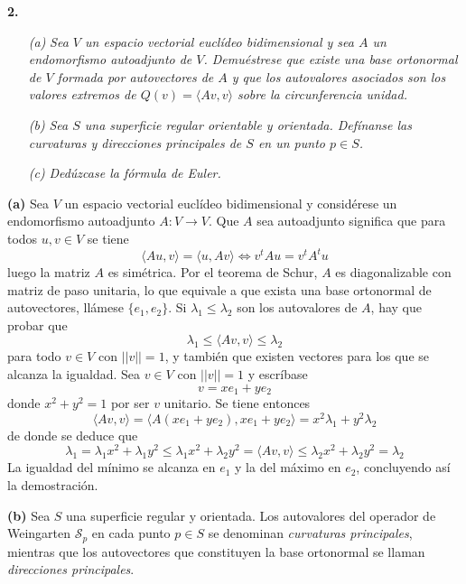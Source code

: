 \documentclass[12pt]{report}
\begin{document}
\vspace{4mm}
\textbf{2.}
\begin{itemize}
    \item[\textit{(a)}] \textit{Sea $V$ un espacio vectorial euclídeo bidimensional y sea $A$ un endomorfismo autoadjunto de $V$. Demuéstrese que existe una base ortonormal de $V$ formada por autovectores de $A$ y que los autovalores asociados son los valores extremos de $Q(v) = \langle Av,v \rangle$ sobre la circunferencia unidad.}
    \item[\textit{(b)}] \textit{Sea $S$ una superficie regular orientable y orientada. Defínanse las curvaturas y direcciones principales de $S$ en un punto $p \in S$.}
    \item[\textit{(c)}] \textit{Dedúzcase la fórmula de Euler.}
\end{itemize}

\vspace{2mm}
\textbf{(a)} Sea $V$ un espacio vectorial euclídeo bidimensional y considérese un endomorfismo autoadjunto $A \colon V \to V$. Que $A$ sea autoadjunto significa que para todos $u,v \in V$ se tiene
\[\langle Au,v \rangle = \langle u,Av \rangle \iff v^tAu = v^tA^tu \]
luego la matriz $A$ es simétrica. Por el teorema de Schur, $A$ es diagonalizable con matriz de paso unitaria, lo que equivale a que exista una base ortonormal de autovectores, llámese $\{e_1,e_2\}$. Si 
$\lambda_1 \leq \lambda_2$ son los autovalores de $A$, hay que probar que
\[\lambda_1 \leq \langle Av,v \rangle \leq \lambda_2\]
para todo $v \in V$ con $||v|| = 1$, y también que existen vectores para los que se alcanza la igualdad. Sea $v \in V$ con $||v|| = 1$ y escríbase
\[v = x e_1+ y e_2\]
donde $x^2+y^2 = 1$ por ser $v$ unitario. Se tiene entonces
\[\langle Av,v \rangle = \langle A(x e_1+ y e_2), x e_1+ y e_2 \rangle = x^2 \lambda_1+y^2\lambda_2\]
de donde se deduce que
\[\lambda_1 = \lambda_1 x^2+\lambda_1 y^2 \leq \lambda_1 x^2+\lambda_2 y^2 = \langle Av,v \rangle \leq \lambda_2 x^2+\lambda_2 y^2 = \lambda_2\]
La igualdad del mínimo se alcanza en $e_1$ y la del máximo en $e_2$, concluyendo así la demostración.

\vspace{2mm}
\textbf{(b)} Sea $S$ una superficie regular y orientada. Los autovalores del operador de Weingarten $\mathcal{S}_p$ en cada punto $p \in S$ se denominan \textit{curvaturas principales}, mientras que los autovectores que constituyen la base ortonormal se llaman \textit{direcciones principales}.
\end{document}
